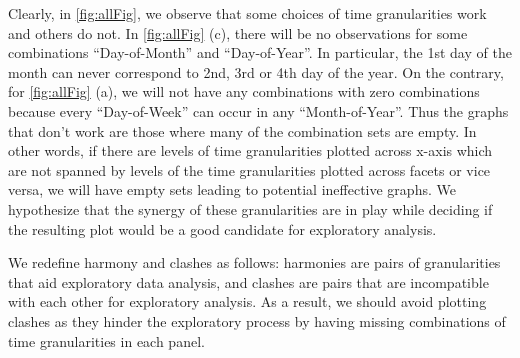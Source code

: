 \documentclass[12pt]{article}
\begin{document}
Clearly, in \autoref{fig:allFig}, we observe that some choices of time
granularities work and others do not. In \autoref{fig:allFig} (c), there
will be no observations for some combinations ``Day-of-Month'' and
``Day-of-Year''. In particular, the 1st day of the month can never
correspond to 2nd, 3rd or 4th day of the year. On the contrary, for
\autoref{fig:allFig} (a), we will not have any combinations with zero
combinations because every ``Day-of-Week'' can occur in any
``Month-of-Year''. Thus the graphs that don't work are those where many
of the combination sets are empty. In other words, if there are levels
of time granularities plotted across x-axis which are not spanned by
levels of the time granularities plotted across facets or vice versa, we
will have empty sets leading to potential ineffective graphs. We
hypothesize that the synergy of these granularities are in play while
deciding if the resulting plot would be a good candidate for exploratory
analysis.

We redefine harmony and clashes as follows: harmonies are pairs of
granularities that aid exploratory data analysis, and clashes are pairs
that are incompatible with each other for exploratory analysis. As a
result, we should avoid plotting clashes as they hinder the exploratory
process by having missing combinations of time granularities in each
panel.
\end{document}
